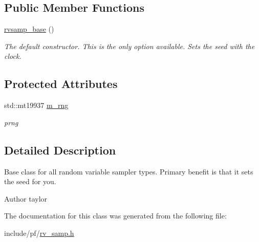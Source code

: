 \subsection*{Public Member Functions}
\begin{DoxyCompactItemize}
\item 
\mbox{\label{classrvsamp_1_1rvsamp__base_ab20e90775a57b9a142520f236b39e7c1}} 
\hyperlink{classrvsamp_1_1rvsamp__base_ab20e90775a57b9a142520f236b39e7c1}{rvsamp\+\_\+base} ()
\begin{DoxyCompactList}\small\item\em The default constructor. This is the only option available. Sets the seed with the clock. \end{DoxyCompactList}\end{DoxyCompactItemize}
\subsection*{Protected Attributes}
\begin{DoxyCompactItemize}
\item 
\mbox{\label{classrvsamp_1_1rvsamp__base_a40eb76e3ecd647c8b1e2d2ef21215dc7}} 
std\+::mt19937 \hyperlink{classrvsamp_1_1rvsamp__base_a40eb76e3ecd647c8b1e2d2ef21215dc7}{m\+\_\+rng}
\begin{DoxyCompactList}\small\item\em prng \end{DoxyCompactList}\end{DoxyCompactItemize}


\subsection{Detailed Description}
Base class for all random variable sampler types. Primary benefit is that it sets the seed for you. 

\begin{DoxyAuthor}{Author}
taylor 
\end{DoxyAuthor}


The documentation for this class was generated from the following file\+:\begin{DoxyCompactItemize}
\item 
include/pf/\hyperlink{rv__samp_8h}{rv\+\_\+samp.\+h}\end{DoxyCompactItemize}
